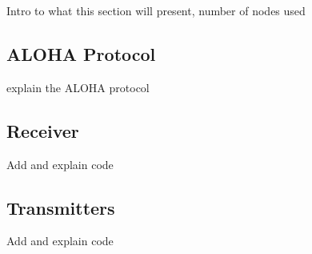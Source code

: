 Intro to what this section will present, number of nodes used 

\subsection{ALOHA Protocol}
explain the ALOHA protocol

\subsection{Receiver}
Add and explain code 

\subsection{Transmitters}
Add and explain code